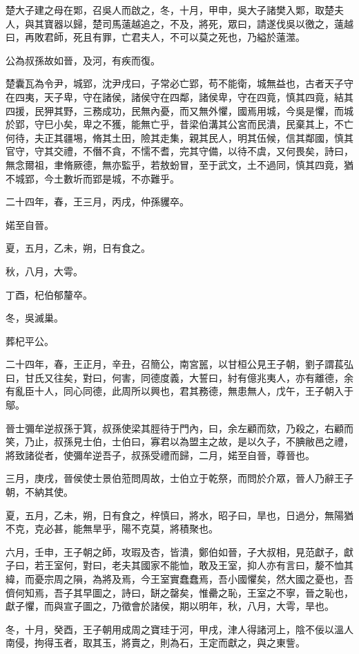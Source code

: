 \begin{pinyinscope}
楚大子建之母在郹，召吳人而啟之，冬，十月，甲申，吳大子諸樊入郹，取楚夫人，與其寶器以歸，楚司馬薳越追之，不及，將死，眾曰，請遂伐吳以徼之，薳越曰，再敗君師，死且有罪，亡君夫人，不可以莫之死也，乃縊於薳澨。

公為叔孫故如晉，及河，有疾而復。

楚囊瓦為令尹，城郢，沈尹戌曰，子常必亡郢，苟不能衛，城無益也，古者天子守在四夷，天子卑，守在諸侯，諸侯守在四鄰，諸侯卑，守在四竟，慎其四竟，結其四援，民狎其野，三務成功，民無內憂，而又無外懼，國焉用城，今吳是懼，而城於郢，守巳小矣，卑之不獲，能無亡乎，昔梁伯溝其公宮而民潰，民棄其上，不亡何待，夫正其疆埸，脩其土田，險其走集，親其民人，明其伍候，信其鄰國，慎其官守，守其交禮，不僭不貪，不懦不耆，完其守備，以待不虞，又何畏矣，詩曰，無念爾祖，聿脩厥德，無亦監乎，若敖蚡冒，至于武文，土不過同，慎其四竟，猶不城郢，今土數圻而郢是城，不亦難乎。

二十四年，春，王三月，丙戌，仲孫貜卒。

婼至自晉。

夏，五月，乙未，朔，日有食之。

秋，八月，大雩。

丁酉，杞伯郁釐卒。

冬，吳滅巢。

葬杞平公。

二十四年，春，王正月，辛丑，召簡公，南宮嚚，以甘桓公見王子朝，劉子謂萇弘曰，甘氏又往矣，對曰，何害，同德度義，大誓曰，紂有億兆夷人，亦有離德，余有亂臣十人，同心同德，此周所以興也，君其務德，無患無人，戊午，王子朝入于鄔。

晉士彌牟逆叔孫于箕，叔孫使梁其脛待于門內，曰，余左顧而欬，乃殺之，右顧而笑，乃止，叔孫見士伯，士伯曰，寡君以為盟主之故，是以久子，不腆敝邑之禮，將致諸從者，使彌牟逆吾子，叔孫受禮而歸，二月，婼至自晉，尊晉也。

三月，庚戌，晉侯使士景伯蒞問周故，士伯立于乾祭，而問於介眾，晉人乃辭王子朝，不納其使。

夏，五月，乙未，朔，日有食之，梓慎曰，將水，昭子曰，旱也，日過分，無陽猶不克，克必甚，能無旱乎，陽不克莫，將積聚也。

六月，壬申，王子朝之師，攻瑕及杏，皆潰，鄭伯如晉，子大叔相，見范獻子，獻子曰，若王室何，對曰，老夫其國家不能恤，敢及王室，抑人亦有言曰，嫠不恤其緯，而憂宗周之隕，為將及焉，今王室實蠢蠢焉，吾小國懼矣，然大國之憂也，吾儕何知焉，吾子其早圖之，詩曰，缾之罄矣，惟罍之恥，王室之不寧，晉之恥也，獻子懼，而與宣子圖之，乃徵會於諸侯，期以明年，秋，八月，大雩，旱也。

冬，十月，癸酉，王子朝用成周之寶珪于河，甲戌，津人得諸河上，陰不佞以溫人南侵，拘得玉者，取其玉，將賣之，則為石，王定而獻之，與之東訾。


\end{pinyinscope}
